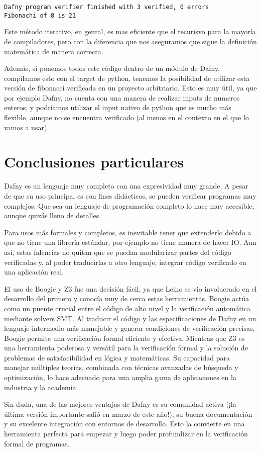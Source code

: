 \documentclass[runningheads]{llncs}
\begin{document}
\begin{verbatim}
Dafny program verifier finished with 3 verified, 0 errors
Fibonachi of 8 is 21
\end{verbatim}

Este método iterativo, en genral, es mas eficiente que el recurisvo para la mayoría de compiladores, pero con la diferencia que nos aseguramos que sigue la definición matemática de manera correcta.

Además, si ponemos todos este código dentro de un módulo de Dafny, compilamos esto con el target de python, tenemos la posibilidad de utilizar esta versión de fibonacci verificada
en un proyecto arbitriario. Esto es muy útil, ya que por ejemplo Dafny, no cuenta con una manera de realizar inputs de numeros enteros, y podríamos utilizar el input nativo de 
python que es mucho más flexible, aunque no se encuentra verificado (al menos en el contexto en el que lo vamos a usar).


\section{Conclusiones particulares}

Dafny es un lenguaje muy completo con una expresividad muy grande. A pesar de que su uso principal es con fines didácticos, se pueden verificar programas muy complejos. 
Que sea un lenguaje de programación completo lo hace muy accesible, aunque quizás lleno de detalles.

Para usos más formales y completos, es inevitable tener que extenderlo debido a que no tiene una librería estándar, por ejemplo no tiene manera de hacer IO.
Aun así, estas falencias no quitan que se puedan modularizar partes del código verificadas y, al poder traducirlas a otro lenguaje, integrar código verificado en una aplicación real.

El uso de Boogie y Z3 fue una decisión fácil, ya que Leino se vio involucrado en el desarrollo del primero y conocía muy de cerca estas herramientas.
Boogie actúa como un puente crucial entre el código de alto nivel y la verificación automática mediante solvers SMT. 
Al traducir el código y las especificaciones de Dafny en un lenguaje intermedio más manejable y generar condiciones de verificación precisas, 
Boogie permite una verificación formal eficiente y efectiva.
Mientras que Z3 es una herramienta poderosa y versátil para la verificación formal y la solución de problemas de satisfacibilidad en lógica y matemáticas. 
Su capacidad para manejar múltiples teorías, combinada con técnicas avanzadas de búsqueda y optimización, 
lo hace adecuado para una amplia gama de aplicaciones en la industria y la academia.

Sin duda, una de las mejores ventajas de Dafny es su comunidad activa (¡la última versión importante salió en marzo de este año!), 
su buena documentación y su excelente integración con entornos de desarrollo. Esto la convierte en una herramienta perfecta para empezar 
y luego poder profundizar en la verificación formal de programas.



\end{document}
